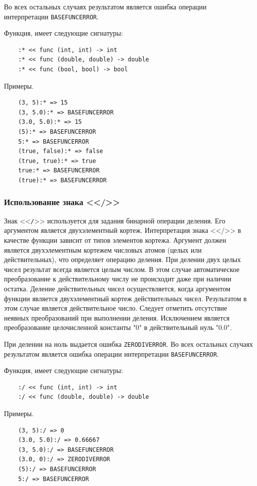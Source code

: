 Во всех остальных случаях результатом является ошибка операции интерпретации \verb|BASEFUNCERROR|.

Функция, имеет следующие сигнатуры:
\begin{verbatim}
    :* << func (int, int) -> int
    :* << func (double, double) -> double
    :* << func (bool, bool) -> bool
\end{verbatim}

Примеры.
\begin{verbatim}
    (3, 5):* => 15
    (3, 5.0):* => BASEFUNCERROR
    (3.0, 5.0):* => 15
    (5):* => BASEFUNCERROR
    5:* => BASEFUNCERROR
    (true, false):* => false
    (true, true):* => true
    true:* => BASEFUNCERROR
    (true):* => BASEFUNCERROR
\end{verbatim}

\subsubsection{Использование знака <</>>}

Знак <<\verb|/|>> используется для задания бинарной операции деления. Его аргументом является двухэлементный кортеж. Интерпретация знака <</>> в качестве функции зависит от типов элементов кортежа. Аргумент должен является двухэлементным кортежем числовых атомов (целых или действительных), что определяет операцию деления. При делении двух целых чисел результат всегда является целым числом. В этом случае автоматическое преобразование к действительному числу не происходит даже при наличии остатка. Деление действительных чисел осуществляется, когда аргументом функции является двухэлементный кортеж действительных чисел. Результатом в этом случае является действительное число. Следует отметить отсутствие неявных преобразований при выполнении деления. Исключением является преобразование целочисленной константы "0" в действительный нуль "0.0".

При делении на ноль выдается ошибка \verb|ZERODIVERROR|. Во всех остальных случаях результатом является ошибка операции интерпретации \verb|BASEFUNCERROR|.

Функция, имеет следующие сигнатуры:
\begin{verbatim}
    :/ << func (int, int) -> int
    :/ << func (double, double) -> double
\end{verbatim}

Примеры.
\begin{verbatim}
    (3, 5):/ => 0
    (3.0, 5.0):/ => 0.66667
    (3, 5.0):/ => BASEFUNCERROR
    (3.0, 0):/ => ZERODIVERROR
    (5):/ => BASEFUNCERROR
    5:/ => BASEFUNCERROR
\end{verbatim}

